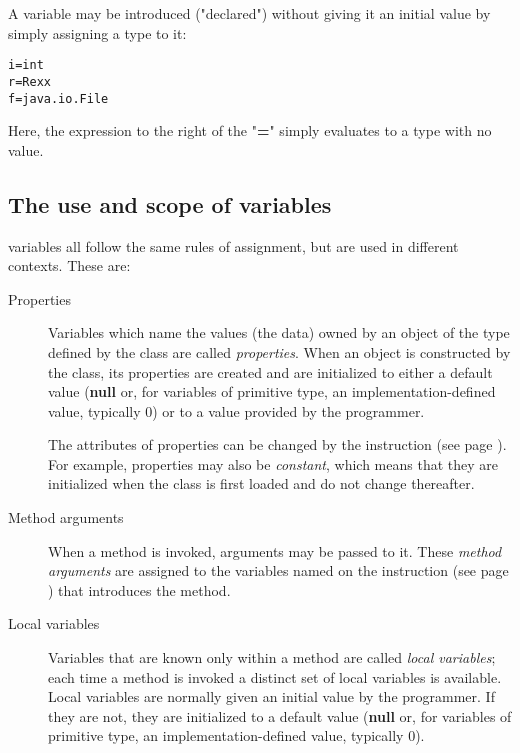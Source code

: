 A variable may be introduced ("declared") without giving it an
initial value by simply assigning a type to it:
\begin{lstlisting}
i=int
r=Rexx
f=java.io.File
\end{lstlisting}
Here, the expression to the right of the "\textbf{=}" simply
evaluates to a type with no value.
\subsection{The use and scope of variables}
 
\nr{} variables all follow the same rules of assignment, but are used
in different contexts.  These are:
\begin{description}
\item[Properties]\label{refprops}

Variables which name the values (the data) owned by an object of the
type defined by the class are called \emph{properties}.
When an object is constructed by the class, its properties are created
and are initialized to either a default value
(\textbf{null} or, for variables of primitive type, an
implementation-defined value, typically 0)
or to a value provided by the programmer.
 
The attributes of properties can be changed by the
 instruction (see page \pageref{refprop}).
For example, properties may also be \emph{constant}, which means
that they are initialized when the class is first loaded and do not
change thereafter.
\item[Method arguments]

When a method is invoked, arguments may be passed to it.
These \emph{method arguments} are assigned to the variables named on
the   instruction (see page \pageref{refmethod})  that introduces the
method.
\item[Local variables]

Variables that are known only within a method are called \emph{local
variables}; each time a method is invoked a distinct set of local
variables is available.
Local variables are normally given an initial value by the programmer.
If they are not, they are initialized to a default value
(\textbf{null} or, for variables of primitive type, an
implementation-defined value, typically 0).
\end{description}
 
